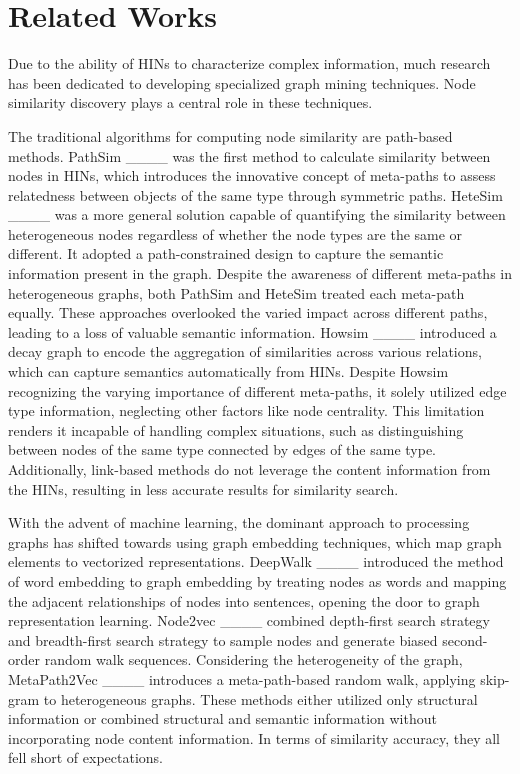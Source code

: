 \section{Related Works}
\label{sec2}

Due to the ability of HINs to characterize complex information, much research has been dedicated to developing specialized graph mining techniques. Node similarity discovery plays a central role in these techniques.

The traditional algorithms for computing node similarity are path-based methods. PathSim ____ was the first method to calculate similarity between nodes in HINs, which introduces the innovative concept of meta-paths to assess relatedness between objects of the same type through symmetric paths. HeteSim ____ was a more general solution capable of quantifying the similarity between heterogeneous nodes regardless of whether the node types are the same or different. It adopted a path-constrained design to capture the semantic information present in the graph. Despite the awareness of different meta-paths in heterogeneous graphs, both PathSim and HeteSim treated each meta-path equally. These approaches overlooked the varied impact across different paths, leading to a loss of valuable semantic information. Howsim ____ introduced a decay graph to encode the aggregation of similarities across various relations, which can capture semantics automatically from HINs. Despite Howsim recognizing the varying importance of different meta-paths, it solely utilized edge type information, neglecting other factors like node centrality. This limitation renders it incapable of handling complex situations, such as distinguishing between nodes of the same type connected by edges of the same type. Additionally, link-based methods do not leverage the content information from the HINs, resulting in less accurate results for similarity search.

With the advent of machine learning, the dominant approach to processing graphs has shifted towards using graph embedding techniques, which map graph elements to vectorized representations. DeepWalk ____ introduced the method of word embedding to graph embedding by treating nodes as words and mapping the adjacent relationships of nodes into sentences, opening the door to graph representation learning. Node2vec ____ combined depth-first search strategy and breadth-first search strategy to sample nodes and generate biased second-order random walk sequences. Considering the heterogeneity of the graph, MetaPath2Vec ____ introduces a meta-path-based random walk, applying skip-gram to heterogeneous graphs. These methods either utilized only structural information or combined structural and semantic information without incorporating node content information. In terms of similarity accuracy, they all fell short of expectations.

